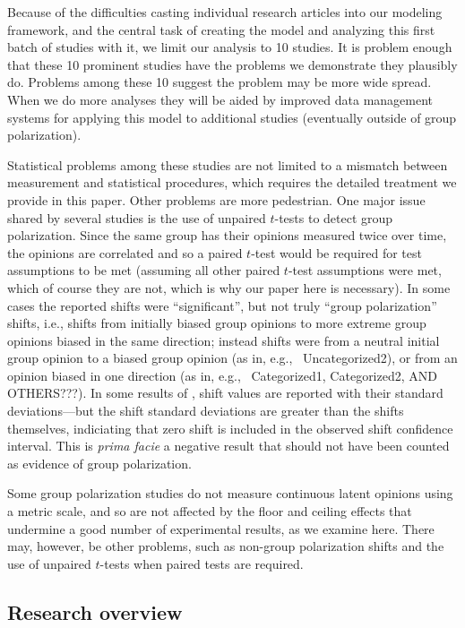 \documentclass[letterpaper,man,natbib]{apa6}
\begin{document}
Because of the difficulties casting individual research articles into our modeling
framework, and the central task of creating the model and analyzing this first
batch of studies with it, we limit our analysis to 10 studies. It is problem
enough that these 10 prominent studies have the problems we demonstrate they
plausibly do. Problems among these 10 suggest the problem may be more wide spread. 
When we do more analyses
they will be aided by improved data management systems for applying this model to 
additional studies (eventually outside of group polarization).

Statistical problems among these studies are not limited to a mismatch between
measurement and statistical procedures, which requires the detailed treatment
we provide in this paper. Other problems are more pedestrian.
One major issue shared by several studies
is the use of unpaired $t$-tests to detect group polarization. Since the same
group has their opinions measured twice over time, the opinions are correlated
and so a paired $t$-test would be required for test assumptions to be met 
(assuming all other paired $t$-test assumptions were met, 
which of course they are not, which is why our paper here is necessary).
In some cases the reported shifts were ``significant'', 
but not truly ``group polarization'' shifts, i.e., 
shifts from initially biased group opinions
to more extreme group opinions biased in the same direction; instead shifts 
were from a neutral initial group opinion to a biased group opinion 
(as in, e.g.,~\citet{Abrams1990} Uncategorized2), or from
an opinion biased in one direction (as in, e.g.,~\citet{Abrams1990} Categorized1,
Categorized2, AND OTHERS???). In some results of \citet{Freidkin1999a}, 
shift values are reported with their
standard deviations---but the shift standard deviations are greater than the
shifts themselves, indiciating that zero shift is included in the observed
shift confidence interval. This is \emph{prima facie} a negative result that
should not have been counted as evidence of group polarization. 

Some group polarization studies do not measure continuous latent opinions using
a metric scale, and so are not affected by the floor and ceiling effects that
undermine a good number of experimental results, as we examine here. There may,
however, be other problems, such as non-group polarization shifts and the use
of unpaired $t$-tests when paired tests are required.

\subsection{Research overview}
\end{document}
